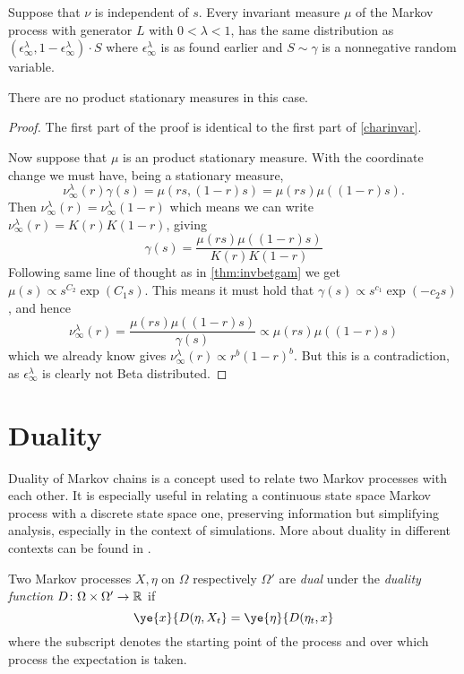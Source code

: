 \documentclass{article}
\begin{document}
\begin{theorem}
Suppose that $\nu$ is independent of $s$. Every invariant measure $\mu$ of the Markov process with generator $L$ with $0 < \lambda < 1$, has the same distribution as $(\epsilon_{\infty}^{\lambda}, 1 - \epsilon_{\infty}^{\lambda}) \cdot S$ where $\epsilon_{\infty}^{\lambda}$ is as found earlier and $S \sim\gamma$ is a nonnegative random variable.

There are no product stationary measures in this case.
\end{theorem}
\begin{proof}
The first part of the proof is identical to the first part of \autoref{charinvar}.

Now suppose that $\mu$ is an product stationary measure. With the coordinate change we must have, being a stationary measure,
\[
\nu_{\infty}^{\lambda}(r) \gamma(s)
= \mu(rs, (1-r)s)
= \mu(rs) \mu((1-r)s).
\]
Then $\nu_{\infty}^{\lambda}(r) = \nu_{\infty}^{\lambda}(1-r)$ which means we can write $\nu_{\infty}^{\lambda}(r) = K(r) K(1-r)$, giving
\[
\gamma(s)
= \frac{\mu(rs) \mu((1-r)s)}{K(r) K(1-r)}
\]
Following same line of thought as in \autoref{thm:invbetgam} we get $\mu(s) \propto s^{C_2} \exp(C_1 s)$.
This means it must hold that $\gamma(s)
\propto s^{c_1} \exp(-c_2 s)$, and hence
\[
\nu_{\infty}^{\lambda}(r)
= \frac{\mu(rs) \mu((1-r)s)}{\gamma(s)}
\propto \mu(rs) \mu((1-r)s)
\]
which we already know gives $\nu_{\infty}^{\lambda}(r) \propto r^b (1-r)^b$. But this is a contradiction, as $\epsilon_{\infty}^{\lambda}$ is clearly not Beta distributed.
\end{proof}






\section{Duality}\label{duality}
Duality of Markov chains is a concept used to relate two Markov processes with each other. It is especially useful in relating a continuous state space Markov process with a discrete state space one, preserving information but simplifying analysis, especially in the context of simulations. More about duality in different contexts can be found in \cite{frankredig2014}.

\begin{definition}[Duality]
Two Markov processes $X, \eta$ on $\Omega$ respectively $\Omega'$ are \emph{dual} under the \emph{duality function} $D\colon \Omega \times \Omega' \to \mathbb{R}$ if
\[
\ye{x}{D(\eta, X_t}
= \ye{\eta}{D(\eta_t, x}
\]
where the subscript denotes the starting point of the process and over which process the expectation is taken.
\end{definition}
\end{document}
